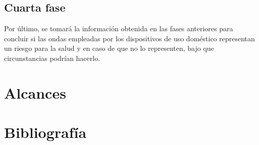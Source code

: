 \documentclass[spanish,notitlepage,letterpaper, 12pt]{article}
\begin{document}
\subsection{Cuarta fase}
Por último, se tomará la información obtenida en las fases anteriores para concluir si las ondas empleadas por los dispositivos de uso doméstico representan un riesgo para la salud y en caso de que no lo representen, bajo que circunstancias podrían hacerlo.
\section{Alcances}
\section{Bibliografía} 


\end{document}
